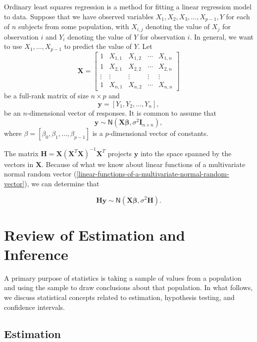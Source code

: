 \documentclass[
]{book}
\theoremstyle{definition}
\theoremstyle{definition}
\theoremstyle{definition}
\theoremstyle{definition}
\theoremstyle{remark}
\begin{document}
Ordinary least squares regression is a method for fitting a linear regression model to data. Suppose that we have observed variables \(X_1, X_2, X_3, \ldots, X_{p-1}, Y\) for each of \(n\) subjects from some population, with \(X_{i,j}\) denoting the value of \(X_j\) for observation \(i\) and \(Y_i\) denoting the value of \(Y\) for observation \(i\). In general, we want to use \(X_1, \ldots, X_{p-1}\) to predict the value of \(Y\). Let
\[
\mathbf{X} =
\begin{bmatrix}
1 & X_{1,1} & X_{1,2} & \cdots & X_{1,n} \\
1 & X_{2,1} & X_{2,2} & \cdots & X_{2,n} \\
\vdots & \vdots & \vdots & \vdots & \vdots \\
1 & X_{n,1} & X_{n,2} & \cdots & X_{n,n}
\end{bmatrix}
\]
be a full-rank matrix of size \(n\times p\) and
\[
\mathbf{y}=[Y_1, Y_2, \ldots,Y_n],
\]
be an \(n\)-dimensional vector of responses. It is common to assume that
\[
\mathbf{y}\sim \mathsf{N}(\mathbf{X}\boldsymbol{\beta}, \sigma^2 \mathbf{I}_{n\times n}),
\]
where \(\beta=[\beta_0,\beta_1,\ldots,\beta_{p-1}]\) is a \(p\)-dimensional vector of constants.

The matrix \(\mathbf{H}=\mathbf{X}(\mathbf{X}^T\mathbf{X})^{-1}\mathbf{X}^T\) projects \(\mathbf{y}\) into the space spanned by the vectors in \(\mathbf{X}\). Because of what we know about linear functions of a multivariate normal random vector (\ref{linear-functions-of-a-multivariate-normal-random-vector}), we can determine that

\[
\mathbf{Hy}\sim \mathsf{N}(\mathbf{X}\boldsymbol{\beta},\sigma^2 \mathbf{H}).
\]

\hypertarget{est-infer-review}{%
\chapter{Review of Estimation and Inference}\label{est-infer-review}}

A primary purpose of statistics is taking a sample of values from a population and using the sample to draw conclusions about that population. In what follows, we discuss statistical concepts related to estimation, hypothesis testing, and confidence intervals.

\hypertarget{estimation}{%
\section{Estimation}\label{estimation}}
\end{document}
